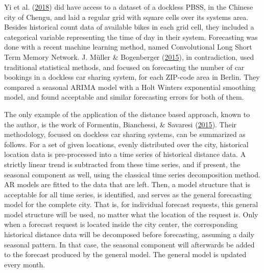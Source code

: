\documentclass[12pt,oneside]{reedthesis}
\begin{document}
Yi et al. (\protect\hyperlink{ref-yi2018}{2018}) did have access to a
dataset of a dockless PBSS, in the Chinese city of Chengu, and laid a
regular grid with square cells over its systems area. Besides historical
count data of available bikes in each grid cell, they included a
categorical variable representing the time of day in their system.
Forecasting was done with a recent machine learning method, named
Convolutional Long Short Term Memory Network. J. Müller \& Bogenberger
(\protect\hyperlink{ref-muller2015}{2015}), in contradiction, used
traditional statistical methods, and focused on forecasting the number
of car bookings in a dockless car sharing system, for each ZIP-code area
in Berlin. They compared a seasonal ARIMA model with a Holt Winters
exponential smoothing model, and found acceptable and similar
forecasting errors for both of them.

The only example of the application of the distance based approach,
known to the author, is the work of Formentin, Bianchessi, \& Savaresi
(\protect\hyperlink{ref-formentin2015}{2015}). Their methodology,
focused on dockless car sharing systems, can be summarized as follows.
For a set of given locations, evenly distributed over the city,
historical location data is pre-processed into a time series of
historical distance data. A strictly linear trend is subtracted from
these time series, and if present, the seasonal component as well, using
the classical time series decomposition method. AR models are fitted to
the data that are left. Then, a model structure that is acceptable for
all time series, is identified, and serves as the general forecasting
model for the complete city. That is, for individual forecast requests,
this general model structure will be used, no matter what the location
of the request is. Only when a forecast request is located inside the
city center, the corresponding historical distance data will be
decomposed before forecasting, assuming a daily seasonal pattern. In
that case, the seasonal component will afterwards be added to the
forecast produced by the general model. The general model is updated
every month.
\end{document}
